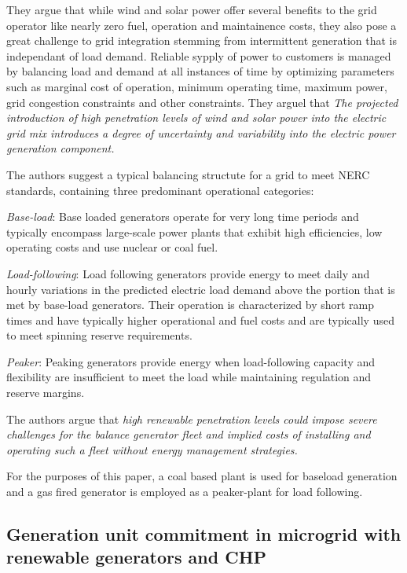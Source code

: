 \documentclass[a4paper]{article}
\begin{document}
They argue that while wind and solar power offer several benefits to the grid operator like nearly zero fuel, operation and maintainence costs, they also pose a great challenge to grid integration stemming from intermittent generation that is independant of load demand. Reliable sypply of power to customers is managed by balancing load and demand at all instances of time by optimizing parameters such as marginal cost of operation, minimum operating time, maximum power, grid congestion constraints and other constraints. They arguel that \textit{The projected introduction of high penetration levels of wind and solar power into the electric grid mix introduces a degree of uncertainty and variability into the electric power generation component.} 

The authors suggest a typical balancing structute for a grid to meet NERC standards, containing three predominant operational categories:

\textit{Base-load}: Base loaded generators operate for very long time periods and typically encompass large-scale power plants that exhibit high efficiencies, low operating costs and use nuclear or coal fuel.

\textit{Load-following}: Load following generators provide energy to meet daily and hourly variations in the predicted electric load demand above the portion that is met by base-load generators. Their operation is characterized by short ramp times and have typically higher operational and fuel costs and are typically used to meet spinning reserve requirements. 

\textit{Peaker}: Peaking generators provide energy when load-following capacity and flexibility are insufficient to meet the load while maintaining regulation and reserve margins.

The authors argue that \textit{high renewable penetration levels could impose severe challenges for the balance generator fleet and implied costs of installing and operating such a fleet without energy management strategies.}

For the purposes of this paper, a coal based plant is used for baseload generation and a gas fired generator is employed as a peaker-plant for load following.  

\subsection{Generation unit commitment in microgrid with renewable generators and CHP}
\end{document}
